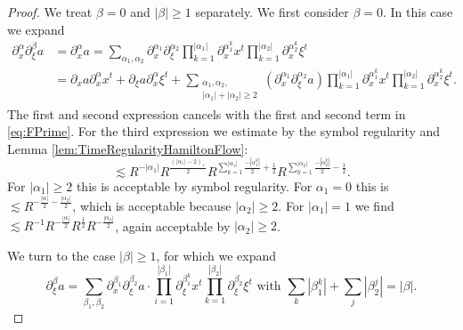 \documentclass{amsart}
\theoremstyle{definition}
\begin{document}
\begin{proof}
We treat $\beta = 0$ and $|\beta| \geq 1$ separately. We first consider $\beta = 0$. In this case we expand
\begin{equation*}
\begin{split}
    \partial_x^{\alpha} \partial_{\xi}^{\beta} a &= \partial_x^{\alpha} a = \sum_{\alpha_1,\alpha_2} \partial_x^{\alpha_1} \partial_{\xi}^{\alpha_2} \prod_{k=1}^{|\alpha_1|} \partial_x^{\alpha_1^k} x^t \prod_{k=1}^{|\alpha_2|} \partial_x^{\alpha_2^k} \xi^t \\
    &= \partial_x a \partial_x^{\alpha} x^t + \partial_{\xi} a \partial_x^{\alpha} \xi^t + \sum_{\substack{\alpha_1,\alpha_2,\\|\alpha_1|+|\alpha_2| \geq 2}} (\partial_x^{\alpha_1} \partial_{\xi}^{\alpha_2} a) \prod_{k=1}^{|\alpha_1|} \partial_x^{\alpha_1^k } x^t  \prod_{k=1}^{|\alpha_2|} \partial_x^{\alpha_2^k} \xi^t.
\end{split}    
\end{equation*}
The first and second expression cancels with the first and second term in \eqref{eq:FPrime}. For the third expression we estimate by the symbol regularity and Lemma \ref{lem:TimeRegularityHamiltonFlow}:
\begin{equation*}
        \lesssim R^{-|\alpha_1|} R^{\frac{(|\alpha_1|-2)_+}{2}} R^{\sum_{k=1}^{|\alpha_1|} \frac{-|\alpha_1^k|}{2}+\frac{1}{2}} R^{\sum_{k=1}^{|\alpha_2|} \frac{-|\alpha_2^k|}{2} - \frac{1}{2}}.
\end{equation*}
For $|\alpha_1| \geq 2$ this is acceptable by symbol regularity. For $\alpha_1 = 0$ this is $\lesssim R^{-\frac{|\alpha|}{2}-\frac{|\alpha_2|}{2}}$, which is acceptable because $|\alpha_2| \geq 2$. For $|\alpha_1| = 1$ we find $\lesssim R^{-1} R^{-\frac{|\alpha|}{2}} R^{\frac{1}{2}} R^{-\frac{|\alpha_2|}{2}}$, again acceptable by $|\alpha_2| \geq 2$. 

\smallskip

We turn to the case $|\beta| \geq 1$, for which we expand 
\begin{equation*}
\partial_{\xi}^{\beta} a = \sum_{\beta_1,\beta_2} \partial_x^{\beta_1} \partial_{\xi}^{\beta_2} a \cdot \prod_{i=1}^{|\beta_1|} \partial_{\xi}^{\beta_1^k} x^t \prod_{k=1}^{|\beta_2|} \partial_{\xi}^{\beta_2} \xi^t \text{ with } \sum_k|\beta_1^k| + \sum_j |\beta_2^j| = |\beta|.
\end{equation*}


\end{proof}
\end{document}
